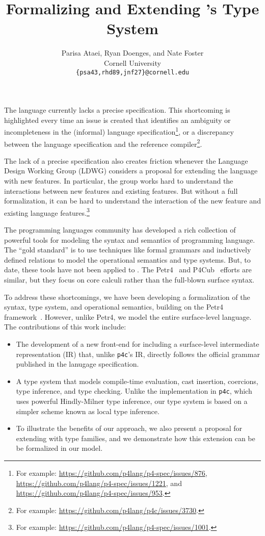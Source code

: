 \documentclass[11pt]{article}
\title{\LARGE Formalizing and Extending \pfour's Type System}
\begin{document}
\author{Parisa Ataei, Ryan Doenges, and Nate Foster\\
  Cornell University \\
  \texttt{\{psa43,rhd89,jnf27\}@cornell.edu}}

\maketitle

The \pfour language currently lacks a precise specification. This
shortcoming is highlighted every time an issue is created that
identifies an ambiguity or incompleteness in the (informal) language
specification\footnote{For
example:
\url{https://github.com/p4lang/p4-spec/issues/876},
\url{https://github.com/p4lang/p4-spec/issues/1221}, and
\url{https://github.com/p4lang/p4-spec/issues/953}.}, or a
discrepancy between the language specification and the reference
compiler\footnote{For example:
\url{https://github.com/p4lang/p4c/issues/3730}.}.

The lack of a precise specification also creates friction whenever
the \pfour Language Design Working Group (LDWG) considers a proposal
for extending the language with new features. In particular, the group
works hard to understand the interactions between new features and
existing features. But without a full formalization, it can be hard to
understand the interaction of the new feature and existing language
features.\footnote{For
example: \url{https://github.com/p4lang/p4-spec/issues/1001}.}

The programming languages community has developed a rich collection of
powerful tools for modeling the syntax and semantics of programming
language. The ``gold standard'' is to use techniques like formal
grammars and inductively defined relations to model the operational
semantics and type systems. But, to date, these tools have not been
applied to \pfour. The Petr4~\cite{petr4} and P4Cub~\cite{p4cub}
efforts are similar, but they focus on core calculi rather than the
full-blown surface syntax.

To address these shortcomings, we have been developing a formalization
of the \pfour syntax, type system, and operational semantics, building
on the Petr4 framework~\cite{petr4}. However, unlike Petr4, we model
the entire surface-level language. The contributions of this work
include:
\begin{itemize}
\item The development of a new front-end for \pfour including
a surface-level intermediate representation (IR) that,
unlike \texttt{p4c}'s IR, directly follows the official grammar
published in the lanugage specification.
\item A type system that models compile-time evaluation, cast insertion,
coercions, type inference, and type checking. Unlike the implementation
in \texttt{p4c}, which uses powerful Hindly-Milner type inference, our
type system is based on a simpler scheme known as local type inference.
\item To illustrate the benefits of our approach, we also present a
proposal for extending \pfour with type families, and we demonstrate
how this extension can be be formalized in our model.
\end{itemize}
\end{document}
